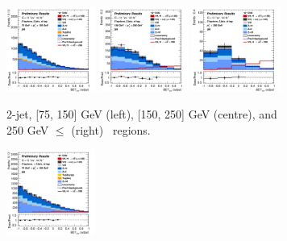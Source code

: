 \newpage

\vspace*{\fill} 

\begin{figure}[h!]
    \centering
    \begin{subfigure}[b]{\textwidth}
        \centering
        \includegraphics[width=0.32\textwidth]{Images/VH/Own_fit/postfit_VHcc/Region_distmva_BMax150_BMin75_DSR_J2_TTypext_T2_L2_Y6051_GlobalFit_conditionnal_mu1.png}
        \includegraphics[width=0.32\textwidth]{Images/VH/Own_fit/postfit_VHcc/Region_distmva_BMax250_BMin150_DSR_J2_TTypext_T2_L2_Y6051_GlobalFit_conditionnal_mu1.png}
        \includegraphics[width=0.32\textwidth]{Images/VH/Own_fit/postfit_VHcc/Region_distmva_BMin250_DSR_J2_TTypext_T2_L2_Y6051_GlobalFit_conditionnal_mu1.png}
        \caption{2-jet, [75, 150] GeV (left), [150, 250] GeV (centre), and 250  GeV $\leq$ (right) \ptv\ regions.}
        \label{fig:plots_VHcc_2L_SR_2c_2J}
    \end{subfigure}
    \begin{subfigure}[b]{\textwidth}
        \centering
        \includegraphics[width=0.32\textwidth]{Images/VH/Own_fit/postfit_VHcc/Region_distmva_BMax150_BMin75_DSR_J3_TTypext_incJet1_T2_L2_Y6051_GlobalFit_conditionnal_mu1.png}

\end{subfigure}
\end{figure}
